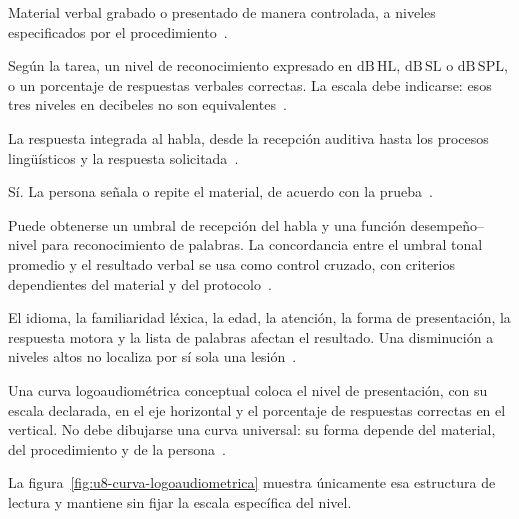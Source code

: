 \begin{description}[style=nextline]
    \item[Estímulo.]
    Material verbal grabado o presentado de manera controlada, a
    niveles especificados por el procedimiento~\cite{ashaHearingAdults,ashaPureTone2005,iso8253_1_2010}.

    \item[Magnitud registrada.]
    Según la tarea, un nivel de reconocimiento expresado en
    \(\mathrm{dB\,HL}\), \(\mathrm{dB\,SL}\) o \(\mathrm{dB\,SPL}\), o un
    porcentaje de respuestas verbales correctas. La escala debe indicarse:
    esos tres niveles en decibeles no son equivalentes~\cite{ashaHearingAdults}.

    \item[Parte del sistema evaluada.]
    La respuesta integrada al habla, desde la recepción auditiva hasta
    los procesos lingüísticos y la respuesta solicitada~\cite{ashaHearingAdults}.

    \item[Respuesta conductual.]
    Sí. La persona señala o repite el material, de acuerdo con la
    prueba~\cite{ashaHearingAdults}.

    \item[Resultado básico esperado.]
    Puede obtenerse un umbral de recepción del habla y una función
    desempeño--nivel para reconocimiento de palabras. La concordancia entre
    el umbral tonal promedio y el resultado verbal se usa como control
    cruzado, con criterios dependientes del material y del protocolo~\cite{ashaHearingAdults}.

    \item[Limitaciones generales.]
    El idioma, la familiaridad léxica, la edad, la atención, la forma de
    presentación, la respuesta motora y la lista de palabras afectan el
    resultado. Una disminución a niveles altos no localiza por sí sola una
    lesión~\cite{ashaHearingAdults}.
\end{description}

Una curva logoaudiométrica conceptual coloca el nivel de presentación, con su
escala declarada, en el eje horizontal y el porcentaje de respuestas correctas
en el vertical. No debe dibujarse una curva universal: su forma depende del
material, del procedimiento y de la persona~\cite{ashaHearingAdults}.

La figura~\ref{fig:u8-curva-logoaudiometrica} muestra únicamente esa estructura
de lectura y mantiene sin fijar la escala específica del nivel.


